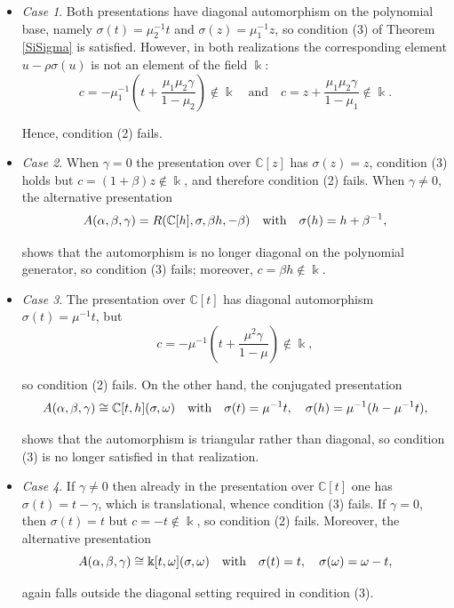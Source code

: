 \documentclass{amsart}
\theoremstyle{definition}
\theoremstyle{remark}
\numberwithin{equation}{section}
\begin{document}
\begin{itemize}
    \item {\em Case 1}. Both presentations have diagonal automorphism on the polynomial base, namely $\sigma(t)=\mu_2^{-1}t$ and $\sigma(z)=\mu_1^{-1}z$, so condition (3) of Theorem \ref{SiSigma} is satisfied. However, in both realizations the corresponding element $u-\rho\sigma(u)$ is not an element of the field $\Bbbk$:
\[
c = -\mu_1^{-1}\left(t+\frac{\mu_1\mu_2\gamma}{1-\mu_2}\right)\notin \Bbbk \quad \text{and} \quad c = z+\frac{\mu_1\mu_2\gamma}{1-\mu_1}\notin \Bbbk.
\]

Hence, condition (2) fails.

\item {\em Case 2}. When $\gamma=0$ the presentation over $\mathbb{C}[z]$ has $\sigma(z)=z$, condition {\rm (3)} holds but $c=(1+\beta)z\notin \Bbbk$, and therefore condition {\rm (2)} fails. When $\gamma\neq 0$, the alternative presentation
\[
A(\alpha,\beta,\gamma)=R(\mathbb{C}[h],\sigma,\beta h,-\beta) 
\quad {\rm with} \quad \sigma(h) = h+\beta^{-1},
\]

shows that the automorphism is no longer diagonal on the polynomial generator, so condition {\rm (3)} fails; moreover, $c=\beta h\notin \Bbbk$.

\item {\em Case 3}. The presentation over $\mathbb{C}[t]$ has diagonal automorphism $\sigma(t)=\mu^{-1}t$, but
\[
c=-\mu^{-1}\left(t+\frac{\mu^2\gamma}{1-\mu}\right)\notin \Bbbk,
\]

so condition {\rm (2)} fails. On the other hand, the conjugated presentation
\[
A(\alpha,\beta,\gamma)\cong \mathbb{C}[t,h](\sigma,\omega) \quad {\rm with} \quad \sigma(t) = \mu^{-1}t, \quad \sigma(h) = \mu^{-1}(h-\mu^{-1}t),
\]

shows that the automorphism is triangular rather than diagonal, so condition {\rm (3)} is no longer satisfied in that realization.

\item {\em Case 4}. If $\gamma\neq 0$ then already in the presentation over $\mathbb{C}[t]$ one has $\sigma(t)=t-\gamma$, which is translational, whence condition {\rm (3)} fails. If $\gamma=0$, then $\sigma(t)=t$ but $c=-t\notin \Bbbk$, so condition {\rm (2)} fails. Moreover, the alternative presentation
\[
A(\alpha,\beta,\gamma)\cong \Bbbk[t,\omega](\sigma,\omega) \quad {\rm with} \quad \sigma(t) = t, \quad \sigma(\omega) = \omega-t,
\]

again falls outside the diagonal setting required in condition {\rm (3)}.
\end{itemize}
\end{document}
